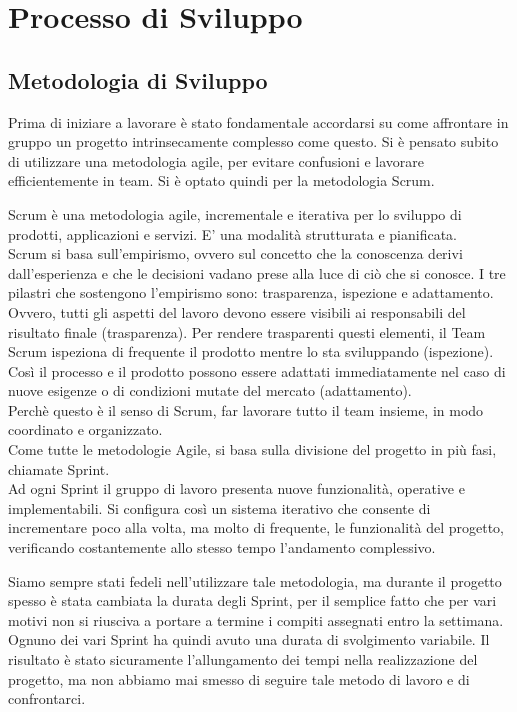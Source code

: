 \chapter{Processo di Sviluppo}


\section{Metodologia di Sviluppo}
Prima di iniziare a lavorare è stato fondamentale accordarsi su come affrontare in gruppo un progetto intrinsecamente complesso come questo. Si è pensato subito di utilizzare una metodologia agile, per evitare confusioni e lavorare efficientemente in team. Si è optato quindi per la metodologia Scrum.\vspace{0.5cm}

    Scrum è una metodologia agile, incrementale e iterativa per lo sviluppo di prodotti, applicazioni e servizi. E' una modalità strutturata e pianificata.\\
    Scrum si basa sull’empirismo, ovvero sul concetto che la conoscenza derivi dall’esperienza e che le decisioni vadano prese alla luce di ciò che si conosce. I tre pilastri che sostengono l’empirismo sono: trasparenza, ispezione e adattamento.\\
    Ovvero, tutti gli aspetti del lavoro devono essere visibili ai responsabili del risultato finale (trasparenza). Per rendere trasparenti questi elementi, il Team Scrum ispeziona di frequente il prodotto mentre lo sta sviluppando (ispezione). Così il processo e il prodotto possono essere adattati immediatamente nel caso di nuove esigenze o di condizioni mutate del mercato (adattamento).\\ 
    Perchè questo è il senso di Scrum, far lavorare tutto il team insieme, in modo coordinato e organizzato.\\
    Come tutte le metodologie Agile, si basa sulla divisione del progetto in più fasi, chiamate Sprint.\\
Ad ogni Sprint il gruppo di lavoro presenta nuove funzionalità, operative e implementabili. Si configura così un sistema iterativo che consente di incrementare poco alla volta, ma molto di frequente, le funzionalità del progetto, verificando costantemente allo stesso tempo l'andamento complessivo.\vspace{0.5cm}

Siamo sempre stati fedeli nell'utilizzare tale metodologia, ma durante il progetto spesso è stata cambiata la durata degli Sprint, per il semplice fatto che per vari motivi non si riusciva a portare a termine i compiti assegnati entro la settimana. Ognuno dei vari Sprint ha quindi avuto una durata di svolgimento variabile. Il risultato è stato sicuramente l'allungamento dei tempi nella realizzazione del progetto, ma non abbiamo mai smesso di seguire tale metodo di lavoro e di confrontarci.



